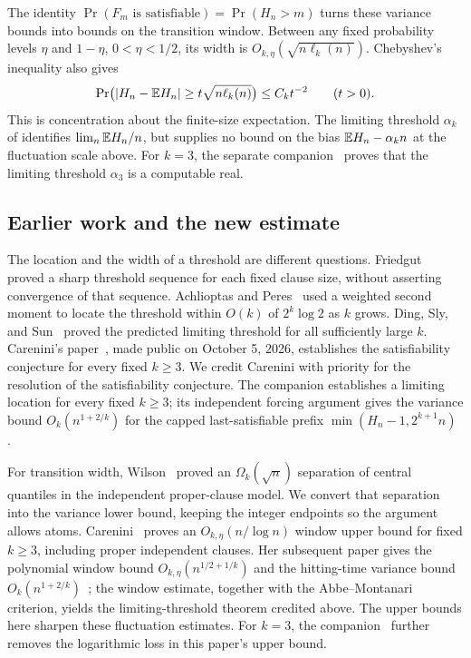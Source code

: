 The identity $\Pr(F_m\text{ is satisfiable})=\Pr(H_n>m)$ turns these
variance bounds into bounds on the transition window. Between any fixed
probability levels $\eta$ and $1-\eta$, $0<\eta<1/2$, its width is
$O_{k,\eta}(\sqrt{n\ell_k(n)})$. Chebyshev's inequality also gives
\[
 \Pr\bigl(|H_n-\mathbb E H_n|\ge t\sqrt{n\ell_k(n)}\bigr)
 \le C_kt^{-2}\qquad(t>0).
\]
This is concentration about the finite-size expectation. The limiting
threshold $\alpha_k$ of \cite[Theorem~\ThresholdTheorem]{FixedKThreshold} identifies
$\lim_n\mathbb E H_n/n$, but supplies no bound on the bias
$\mathbb E H_n-\alpha_kn$ at the fluctuation scale above.
For $k=3$, the separate companion~\cite[Theorem~1.1]{ComputableThreeSATThreshold}
proves that the limiting threshold $\alpha_3$ is a computable real.

\subsection{Earlier work and the new estimate}

The location and the width of a threshold are different questions.
Friedgut~\cite[Theorem~1.3]{Friedgut} proved a sharp threshold sequence
for each fixed clause size, without asserting convergence of that
sequence. Achlioptas and Peres~\cite[Theorems~1--2]{AchlioptasPeres}
used a weighted second moment to locate the threshold within $O(k)$ of
$2^k\log2$ as $k$ grows. Ding, Sly, and Sun~\cite[Theorem~1]{DSS}
proved the predicted limiting threshold for all sufficiently large $k$.
Carenini's paper~\cite[Corollary~1.2]{Carenini2026Polynomial}, made public
on October 5, 2026, establishes the satisfiability conjecture for every
fixed $k\ge3$. We credit Carenini with priority for the resolution of the
satisfiability conjecture.
The companion \cite[Theorem~\ThresholdTheorem]{FixedKThreshold} establishes a limiting
location for every fixed $k\ge3$; its independent forcing argument gives
the variance bound $O_k(n^{1+2/k})$ for the capped
last-satisfiable prefix $\min(H_n-1,2^{k+1}n)$
\cite[Proposition~\ThresholdVariance]{FixedKThreshold}.

For transition width, Wilson~\cite[Corollary~4]{Wilson} proved an
$\Omega_k(\sqrt n)$ separation of central quantiles in the independent
proper-clause model. We convert that separation into the variance lower
bound, keeping the integer endpoints so the argument allows atoms.
Carenini~\cite[Corollaries~7.10--7.11]{Carenini} proves an
$O_{k,\eta}(n/\log n)$ window upper bound for fixed $k\ge3$, including
proper independent clauses. Her subsequent paper gives the polynomial
window bound $O_{k,\eta}(n^{1/2+1/k})$ and the hitting-time variance bound
$O_k(n^{1+2/k})$~\cite[Theorems~1.1 and~1.3]{Carenini2026Polynomial};
the window estimate, together with the Abbe--Montanari criterion, yields
the limiting-threshold theorem credited above.
The upper bounds here sharpen these fluctuation estimates. For $k=3$,
the companion~\cite{LinearThreeSATVariance} further removes the logarithmic
loss in this paper's upper bound.

